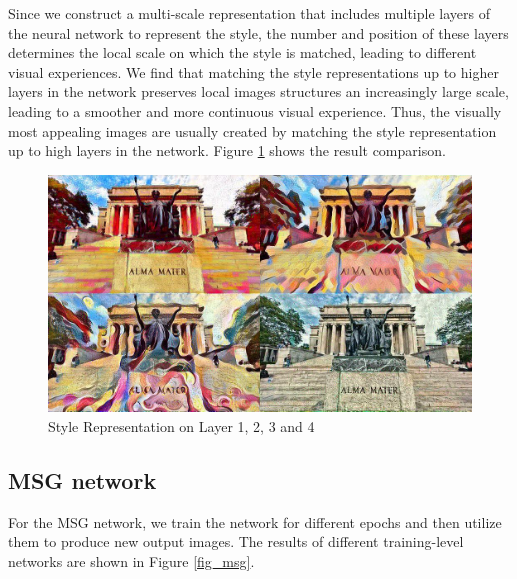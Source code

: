 \documentclass[10pt,twocolumn,letterpaper]{article}
\begin{document}
Since we construct a multi-scale representation that includes multiple layers of the neural network to represent the style, the number and position of these layers determines the local scale on which the style is matched, leading to different visual experiences. We find that matching the style representations up to higher layers in the network preserves local images structures an increasingly large scale, leading to a smoother and more continuous visual experience. Thus, the visually most appealing images are usually created by matching the style representation up to high layers in the network. Figure \ref{fig_layers} shows the result comparison.

\begin{figure}[t]
\begin{center}
\includegraphics[width=0.9\linewidth]{images/merge_style.jpg}
\end{center}
\caption{Style Representation on Layer 1, 2, 3 and 4}
\label{fig:long}
\label{fig:onecol}
\label{fig_layers}
\end{figure}

\subsection{MSG network}

For the MSG network, we train the network for different epochs and then utilize them to produce new output images. The results of different training-level networks are shown in Figure \ref{fig_msg}.
\end{document}
